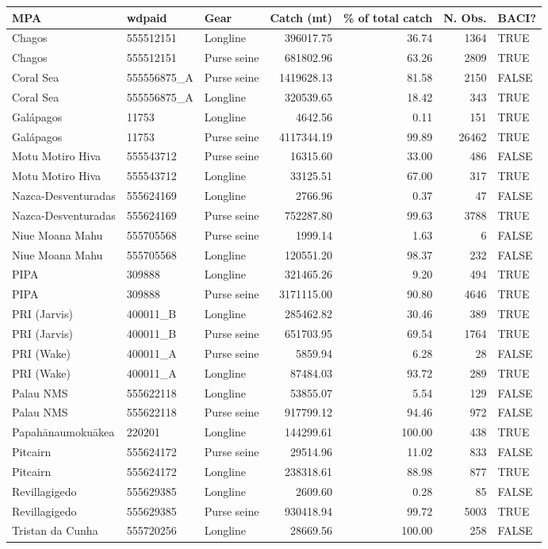\begin{table}
\centering
\begin{tabular}{lllrrrl}
\toprule
MPA & wdpaid & Gear & Catch (mt) & \% of total catch & N. Obs. & BACI?\\
\midrule
Chagos & 555512151 & Longline & 396017.75 & 36.74 & 1364 & TRUE\\
Chagos & 555512151 & Purse seine & 681802.96 & 63.26 & 2809 & TRUE\\
Coral Sea & 555556875\_A & Purse seine & 1419628.13 & 81.58 & 2150 & FALSE\\
Coral Sea & 555556875\_A & Longline & 320539.65 & 18.42 & 343 & TRUE\\
Galápagos & 11753 & Longline & 4642.56 & 0.11 & 151 & TRUE\\
\addlinespace
Galápagos & 11753 & Purse seine & 4117344.19 & 99.89 & 26462 & TRUE\\
Motu Motiro Hiva & 555543712 & Purse seine & 16315.60 & 33.00 & 486 & FALSE\\
Motu Motiro Hiva & 555543712 & Longline & 33125.51 & 67.00 & 317 & TRUE\\
Nazca-Desventuradas & 555624169 & Longline & 2766.96 & 0.37 & 47 & FALSE\\
Nazca-Desventuradas & 555624169 & Purse seine & 752287.80 & 99.63 & 3788 & TRUE\\
\addlinespace
Niue Moana Mahu & 555705568 & Purse seine & 1999.14 & 1.63 & 6 & FALSE\\
Niue Moana Mahu & 555705568 & Longline & 120551.20 & 98.37 & 232 & FALSE\\
PIPA & 309888 & Longline & 321465.26 & 9.20 & 494 & TRUE\\
PIPA & 309888 & Purse seine & 3171115.00 & 90.80 & 4646 & TRUE\\
PRI (Jarvis) & 400011\_B & Longline & 285462.82 & 30.46 & 389 & TRUE\\
\addlinespace
PRI (Jarvis) & 400011\_B & Purse seine & 651703.95 & 69.54 & 1764 & TRUE\\
PRI (Wake) & 400011\_A & Purse seine & 5859.94 & 6.28 & 28 & FALSE\\
PRI (Wake) & 400011\_A & Longline & 87484.03 & 93.72 & 289 & TRUE\\
Palau NMS & 555622118 & Longline & 53855.07 & 5.54 & 129 & FALSE\\
Palau NMS & 555622118 & Purse seine & 917799.12 & 94.46 & 972 & FALSE\\
\addlinespace
Papahānaumokuākea & 220201 & Longline & 144299.61 & 100.00 & 438 & TRUE\\
Pitcairn & 555624172 & Purse seine & 29514.96 & 11.02 & 833 & FALSE\\
Pitcairn & 555624172 & Longline & 238318.61 & 88.98 & 877 & TRUE\\
Revillagigedo & 555629385 & Longline & 2609.60 & 0.28 & 85 & FALSE\\
Revillagigedo & 555629385 & Purse seine & 930418.94 & 99.72 & 5003 & TRUE\\
\addlinespace
Tristan da Cunha & 555720256 & Longline & 28669.56 & 100.00 & 258 & FALSE\\
\bottomrule
\end{tabular}
\end{table}
